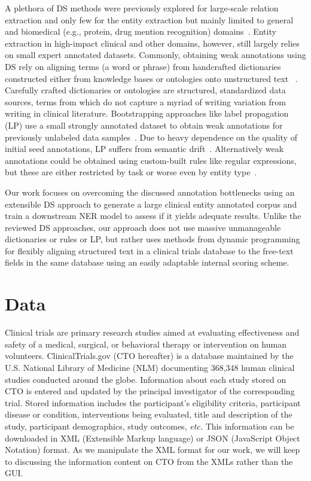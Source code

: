 \documentclass[letterpaper]{article} %
\begin{document}
A plethora of DS methods were previously explored for large-scale relation extraction and only few for the entity extraction but mainly limited to general and biomedical (e.g., protein, drug mention recognition) domains~\cite{etzioni2008open,smirnova2018relation,adelani2020distant}.
Entity extraction in high-impact clinical and other domains, however, still largely relies on small expert annotated datasets.
Commonly, obtaining weak annotations using DS rely on aligning terms (a word or phrase) from handcrafted dictionaries constructed either from knowledge bases or ontologies onto unstructured text ~\citep{giannakopoulos2017unsupervised,yang2018distantly, ghiasvand2018learning,peng2019distantly,hedderich2021anea}.
Carefully crafted dictionaries or ontologies are structured, standardized data sources, terms from which do not capture a myriad of writing variation from writing in clinical literature.
Bootstrapping approaches like label propagation (LP) use a small strongly annotated dataset to obtain weak annotations for previously unlabeled data samples~\cite{bing2017bootstrapping}.
Due to heavy dependence on the quality of initial seed annotations, LP suffers from semantic drift~\cite{komachi2008graph,nagesh2018keep}.
Alternatively weak annotations could be obtained using custom-built rules like regular expressions, but these are either restricted by task or worse even by entity type~\cite{ratner2017snorkel,safranchik2020weakly,fries2021ontology}.

Our work focuses on overcoming the discussed annotation bottlenecks using an extensible DS approach to generate a large clinical entity annotated corpus and train a downstream NER model to assess if it yields adequate results.
Unlike the reviewed DS approaches, our approach does not use massive unmanageable dictionaries or rules or LP, but rather uses methods from dynamic programming for flexibly aligning structured text in a clinical trials database to the free-text fields in the same database using an easily adaptable internal scoring scheme.
%
\section{Data}
\label{sec:data}
%
Clinical trials are primary research studies aimed at evaluating effectiveness and safety of a medical, surgical, or behavioral therapy or intervention on human volunteers.
ClinicalTrials.gov (CTO hereafter) is a database maintained by the U.S. National Library of Medicine (NLM) documenting 368,348 human clinical studies conducted around the globe.
Information about each study stored on CTO is entered and updated by the principal investigator of the corresponding trial.
Stored information includes the participant's eligibility criteria, participant disease or condition, interventions being evaluated, title and description of the study, participant demographics, study outcomes, \textit{etc.}
This information can be downloaded in XML (Extensible Markup language) or JSON (JavaScript Object Notation) format.
As we manipulate the XML format for our work, we will keep to discussing the information content on CTO from the XMLs rather than the GUI.
\end{document}
